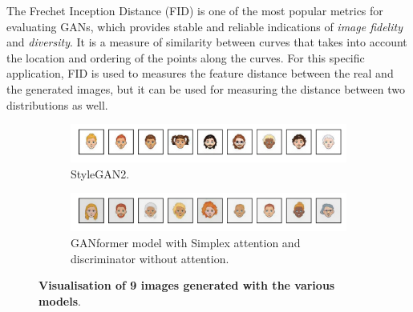 \documentclass{article}
\begin{document}
	The Frechet Inception Distance (FID) is one of the most popular metrics for evaluating GANs, which 
	provides stable and reliable indications of \textit{image fidelity} and \textit{diversity}. 
	It is a measure of similarity between curves that takes into account the location and ordering of the 
	points along the curves. 
	For this specific application, FID is used to measures the feature distance between the real and the 
	generated images, but it can be used for measuring the distance between two distributions as well.

	\begin{figure}[ht]
		\centering
		\begin{subfigure}{\linewidth}
			\includegraphics[width=\linewidth]{../src/trained_network/out_imgs/random_Stylegan2_300kimg.png}
			\vspace{-7mm}
			\caption{StyleGAN2.} 
		\end{subfigure}
		\begin{subfigure}{\linewidth}
			\includegraphics[width=\linewidth]{../src/trained_network/out_imgs/random_GANFormer_Simplex_D_StyleGAN_300kimg.png}
			\vspace{-7mm}
			\caption{GANformer model with Simplex attention and discriminator without attention.}
		\end{subfigure}
		\vspace{3mm}
		\caption{\textbf{Visualisation of 9 images generated with the various models}.}\label{fig:random}
	\end{figure}
\end{document}

